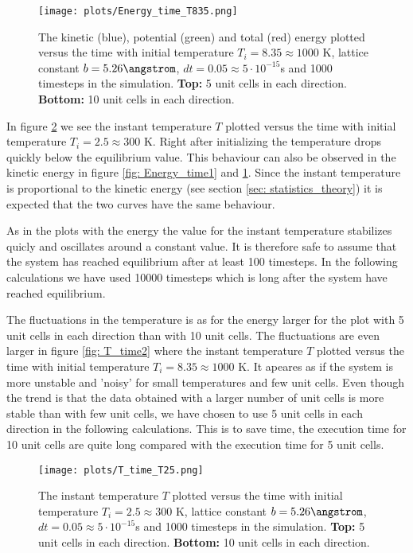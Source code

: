 \documentclass[11pt,a4wide]{article}
\begin{document}
\begin{figure}[htp]
\centering
\texttt{[image: plots/Energy\_time\_T835.png]}
\caption{The kinetic (blue), potential (green) and total (red) energy plotted versus the time with initial temperature $T_i = 8.35 \approx 1000$ K, lattice constant $b=5.26 \angstrom$, $dt=0.05\approx  5\cdot 10^{-15}$s and 1000 timesteps in the simulation. \textbf{Top:} 5 unit cells in each direction. \textbf{Bottom:} 10 unit cells in each direction.}
\label{fig: Energy_time2}
\end{figure}

In figure \ref{fig: T_time1} we see the instant temperature $T$ plotted versus the time with initial temperature $T_i = 2.5 \approx 300$ K. Right after initializing the temperature drops quickly below the equilibrium value. This behaviour can also be observed in the kinetic energy in figure \ref{fig: Energy_time1} and \ref{fig: Energy_time2}. Since the instant temperature is proportional to the kinetic energy (see section \ref{sec: statistics_theory}) it is expected that the two curves have the same behaviour.

As in the plots with the energy the value for the instant temperature stabilizes quicly and oscillates around a constant value. It is therefore safe to assume that the system has reached equilibrium after at least 100 timesteps. In the following calculations we have used 10000 timesteps which is long after the system have reached equilibrium. 

The fluctuations in the temperature is as for the energy larger for the plot with 5 unit cells in each direction than with 10 unit cells. The fluctuations are even larger in figure \ref{fig: T_time2} where the instant temperature $T$ plotted versus the time with initial temperature $T_i = 8.35 \approx 1000$ K. It apeares as if the system is more unstable and 'noisy' for small temperatures and few unit cells. Even though the trend is that the data obtained with a larger number of unit cells is more stable than with few unit cells, we have chosen to use 5 unit cells in each direction in the following calculations. This is to save time, the execution time for 10 unit cells are quite long compared with the execution time for 5 unit cells. 

\begin{figure}[htp]
\centering
\texttt{[image: plots/T\_time\_T25.png]}
\caption{The instant temperature $T$ plotted versus the time with initial temperature $T_i = 2.5 \approx 300$ K, lattice constant $b=5.26 \angstrom$, $dt=0.05\approx  5\cdot 10^{-15}$s and 1000 timesteps in the simulation. \textbf{Top:} 5 unit cells in each direction. \textbf{Bottom:} 10 unit cells in each direction.}
\label{fig: T_time1}
\end{figure}
\end{document}
